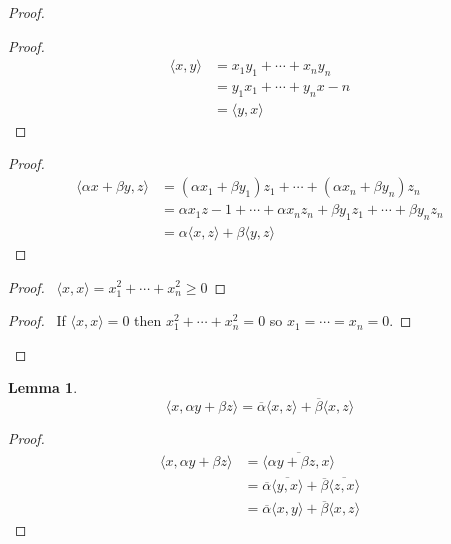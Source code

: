 \documentclass{book}
\newtheorem{lm}{Lemma}[chapter]
\theoremstyle{definition}
\begin{document}
  \begin{proof}
    \begin{proof}
      \pf\ \begin{align*}
        \langle x,y \rangle & = x_1 y_1 + \cdots + x_n y_n \\
        & = y_1 x_1 + \cdots + y_n x-n \\
        & = \langle y, x \rangle
      \end{align*}
    \end{proof}
    \begin{proof}
      \pf\ \begin{align*}
        \langle \alpha x + \beta y, z \rangle & = (\alpha x_1 + \beta y_1) 
        z_1 + \cdots + (\alpha x_n + \beta y_n) z_n \\
        & = \alpha x_1 z-1 + \cdots + \alpha x_n z_n + \beta y_1 z_1 + \cdots + 
        \beta 
        y_n z_n \\
        & = \alpha \langle x, z \rangle + \beta \langle y, z \rangle
      \end{align*}
    \end{proof}
    \begin{proof}
      \pf\ $\langle x, x \rangle = x_1^2 + \cdots + x_n^2 \geq 0$
    \end{proof}
    \begin{proof}
      \pf\ If $\langle x, x \rangle = 0$ then $x_1^2 + \cdots + x_n^2 = 0$ so 
      $x_1 = \cdots = x_n = 0$.
    \end{proof}
  \end{proof}
  
  \begin{lm}
    \[ \langle x, \alpha y + \beta z \rangle = \overline{\alpha} \langle x,z
    \rangle + \overline{\beta} \langle x, z \rangle \]
  \end{lm}
  
  \begin{proof}
\begin{align*}
  \langle x, \alpha y + \beta z \rangle & = \overline{\langle \alpha y + \beta
z, x \rangle} \\
& = \overline{\alpha} \overline{\langle y, x \rangle} + \overline{\beta}
\overline{\langle z, x \rangle} \\
& = \overline{\alpha} \langle x,y \rangle + \overline{\beta} \langle x, z
\rangle
\end{align*}
\end{proof}
\end{document}
